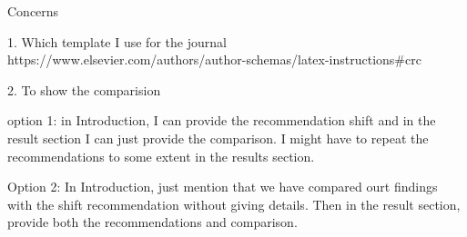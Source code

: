 Concerns

1. Which template I use for the journal
https://www.elsevier.com/authors/author-schemas/latex-instructions#crc

2. To show the comparision

option 1: in Introduction, I can provide the recommendation shift and in the result section I can just provide the comparison. I might have to repeat the recommendations to some extent in the results section.

Option 2: In Introduction, just mention that we have compared ourt findings with the shift recommendation without giving details. Then in the result section, provide both the recommendations and comparison.